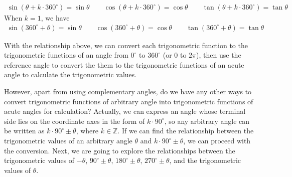 \documentclass{report}
\begin{document}
\begin{info}
    \begin{align*}
        \sin(\theta + k \cdot 360^\circ) = \sin \theta \qquad \cos(\theta + k \cdot 360^\circ) = \cos \theta \qquad \tan(\theta + k \cdot 360^\circ) = \tan \theta 
    \end{align*}
    \noindent When $k = 1$, we have
    \begin{align*}
        \sin(360^\circ + \theta) = \sin \theta \qquad \cos(360^\circ + \theta) = \cos \theta \qquad \tan(360^\circ + \theta) = \tan \theta
    \end{align*}
\end{info}
With the relationship above, we can convert each trigonometric function to the trigonometric functions of an angle from $0^\circ$ to $360^\circ$ (or $0$ to $2\pi$), then use the reference angle to convert the them to the trigonometric functions of an acute angle to calculate the trigonometric values.

However, apart from using complementary angles, do we have any other ways to convert trigonometric functions of arbitrary angle into trigonometric functions of acute angles for calculation? Actually, we can express an angle whose terminal side lies on the coordinate axes in the form of $k \cdot 90^{\circ}$, so any arbitrary angle can be written as $k \cdot 90^{\circ} \pm \theta$, where $k \in \mathbb{Z}$. If we can find the relationship between the trigonometric values of an arbitrary angle $\theta$ and $k \cdot 90^{\circ} \pm \theta$, we can proceed with the conversion. Next, we are going to explore the relationships between the trigonometric values of $-\theta$, $90^{\circ} \pm \theta$, $180^{\circ} \pm \theta$, $270^{\circ} \pm \theta$, and the trigonometric values of $\theta$.
\end{document}
